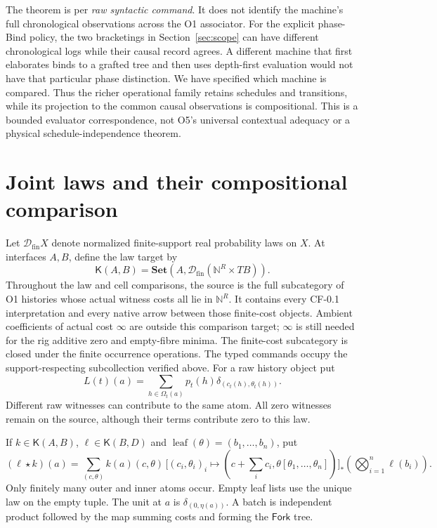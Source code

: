\documentclass[11pt,a4paper]{article}
\theoremstyle{definition}
\newcommand{\Set}{\mathbf{Set}}
\newcommand{\leaf}{\operatorname{leaf}}
\begin{document}
The theorem is per \emph{raw syntactic command}. It does not identify the
machine's full chronological observations across the O1 associator.
For the explicit phase-Bind policy, the two bracketings in
Section~\ref{sec:scope} can have different chronological logs while their
causal record agrees. A different machine that first elaborates binds to
a grafted tree and then uses depth-first evaluation would not have that
particular phase distinction. We have specified which machine is compared.
Thus the richer operational family retains schedules and transitions, while
its projection to the common causal observations is compositional.
This is a bounded evaluator correspondence, not O5's universal contextual
adequacy or a physical schedule-independence theorem.

\section{Joint laws and their compositional comparison}\label{sec:comparison}
Let $\mathcal D_{\mathrm{fin}}X$ denote normalized finite-support real
probability laws on $X$. At interfaces $A,B$, define the law target by
\[
 \mathsf K(A,B)=\Set(A,\mathcal D_{\mathrm{fin}}(\mathbb N^R\times TB)).
\]
Throughout the law and cell comparisons, the source is the full
subcategory of O1 histories whose actual witness costs all lie in
$\mathbb N^R$. It contains every CF-0.1 interpretation and every native
arrow between those finite-cost objects. Ambient coefficients of actual
cost $\infty$ are outside this comparison target; $\infty$ is still
needed for the rig additive zero and empty-fibre minima. The finite-cost
subcategory is closed under the finite occurrence operations.
The typed commands occupy the support-respecting subcollection verified
above. For a raw history object put
\begin{equation}\label{eq:law}
 L(t)(a)=\sum_{h\in\Omega_t(a)}p_t(h)
                  \delta_{(c_t(h),\theta_t(h))}.
\end{equation}
Different raw witnesses can contribute to the same atom. All zero witnesses
remain on the source, although their terms contribute zero to this law.

If $k\in\mathsf K(A,B)$, $\ell\in\mathsf K(B,D)$ and
$\leaf(\theta)=(b_1,\ldots,b_n)$, put
\begin{equation}\label{eq:tree-law}
 (\ell\star k)(a)=
 \sum_{(c,\theta)}k(a)(c,\theta)\,
 \bigl[(c_i,\theta_i)_i\mapsto
 (c+\textstyle\sum_i c_i,\theta[\theta_1,\ldots,\theta_n])\bigr]_*
 \left(\bigotimes_{i=1}^n\ell(b_i)\right).
\end{equation}
Only finitely many outer and inner atoms occur. Empty leaf lists use the
unique law on the empty tuple. The unit at $a$ is
$\delta_{(0,\eta(a))}$. A batch is independent product followed by the
map summing costs and forming the $\mathsf{Fork}$ tree.
\end{document}
